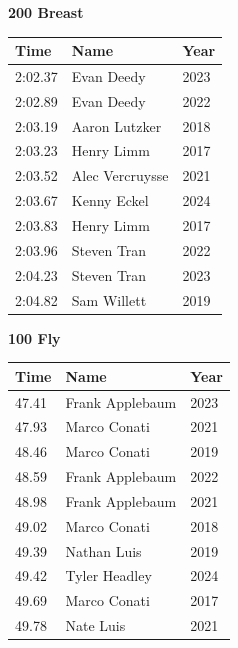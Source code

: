 \hfill
\begin{minipage}[t]{0.48\textwidth}
\centering
\textbf{\textcolor{teamprimary}{200 Breast}}\par
\vspace{0.5em}
\centering
\small
\renewcommand{\arraystretch}{1.0}
\setlength{\tabcolsep}{4pt}
\begin{tabular}{@{}p{1.8cm}p{3.0cm}p{1.0cm}@{}}
\toprule
\textbf{Time} & \textbf{Name} & \textbf{Year} \\
\midrule
2:02.37 & Evan Deedy & 2023 \\
2:02.89 & Evan Deedy & 2022 \\
2:03.19 & Aaron Lutzker & 2018 \\
2:03.23 & Henry Limm & 2017 \\
2:03.52 & Alec Vercruysse & 2021 \\
2:03.67 & Kenny Eckel & 2024 \\
2:03.83 & Henry Limm & 2017 \\
2:03.96 & Steven Tran & 2022 \\
2:04.23 & Steven Tran & 2023 \\
2:04.82 & Sam Willett & 2019 \\
\bottomrule
\end{tabular}
\end{minipage}
\vspace{1.2em}
\noindent\begin{minipage}[t]{0.48\textwidth}
\centering
\textbf{\textcolor{teamprimary}{100 Fly}}\par
\vspace{0.5em}
\centering
\small
\renewcommand{\arraystretch}{1.0}
\setlength{\tabcolsep}{4pt}
\begin{tabular}{@{}p{1.8cm}p{3.0cm}p{1.0cm}@{}}
\toprule
\textbf{Time} & \textbf{Name} & \textbf{Year} \\
\midrule
47.41 & Frank Applebaum & 2023 \\
47.93 & Marco Conati & 2021 \\
48.46 & Marco Conati & 2019 \\
48.59 & Frank Applebaum & 2022 \\
48.98 & Frank Applebaum & 2021 \\
49.02 & Marco Conati & 2018 \\
49.39 & Nathan Luis & 2019 \\
49.42 & Tyler Headley & 2024 \\
49.69 & Marco Conati & 2017 \\
49.78 & Nate Luis & 2021 \\
\bottomrule
\end{tabular}
\end{minipage}
